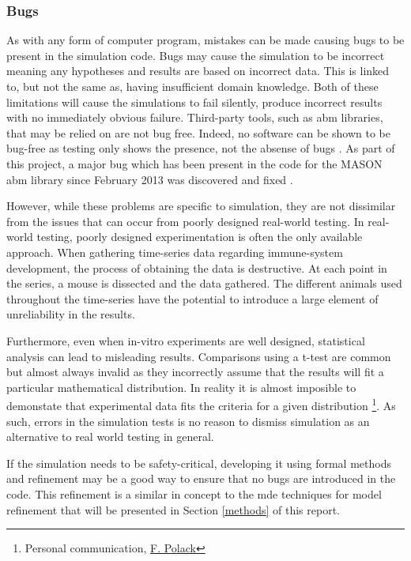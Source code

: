 \documentclass{UoYCSproject}
\begin{document}
\subsubsection{Bugs}
As with any form of computer program, mistakes can be made causing bugs to be present in the simulation code.
Bugs may cause the simulation to be incorrect meaning any hypotheses and results are based on incorrect data.
This is linked to, but not the same as, having insufficient domain knowledge.
Both of these limitations will cause the simulations to fail silently, produce incorrect results with no immediately obvious failure.
Third-party tools, such as \gls{abm} libraries, that may be relied on are not bug free.
Indeed, no software can be shown to be bug-free as testing only shows the presence, not the absense of bugs \cite[p.16]{dijkstra}.
As part of this project, a major bug which has been present in the code for the \gls{MASON} \gls{abm} library since February 2013 was discovered and fixed \cite{mason_pull_request}.


However, while these problems are specific to simulation, they are not dissimilar from the issues that can occur from poorly designed real-world testing.
In real-world testing, poorly designed experimentation is often the only available approach.
When gathering time-series data regarding immune-system development, the process of obtaining the data is destructive.
At each point in the series, a mouse is dissected and the data gathered.
The different animals used throughout the time-series have the potential to introduce a large element of unreliability in the results.

Furthermore, even when \gls{in-vitro} experiments are well designed, statistical analysis can lead to misleading results.
Comparisons using a t-test are common but almost always invalid as they incorrectly assume that the results will fit a particular mathematical distribution.
In reality it is almost imposible to demonstate that experimental data fits the criteria for a given distribution \footnote{Personal communication, \href{http://www.scm.keele.ac.uk/staff/f_polack/}{F. Polack}}.
As such, errors in the simulation tests is no reason to dismiss simulation as an alternative to real world testing in general.

If the simulation needs to be safety-critical, developing it using formal methods and refinement may be a good way to ensure that no bugs are introduced in the code.
This refinement is a similar in concept to the \gls{mde} techniques for model refinement that will be presented in Section \ref{methods} of this report.
\end{document}
